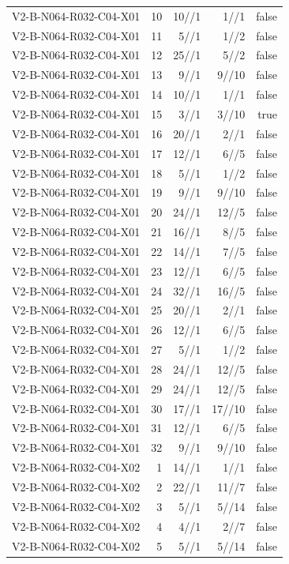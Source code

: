 {\begin{longtable}{lrrrr}
V2-B-N064-R032-C04-X01 & 10 & 10//1 & 1//1 & false \\
V2-B-N064-R032-C04-X01 & 11 & 5//1 & 1//2 & false \\
V2-B-N064-R032-C04-X01 & 12 & 25//1 & 5//2 & false \\
V2-B-N064-R032-C04-X01 & 13 & 9//1 & 9//10 & false \\
V2-B-N064-R032-C04-X01 & 14 & 10//1 & 1//1 & false \\
V2-B-N064-R032-C04-X01 & 15 & 3//1 & 3//10 & true \\
V2-B-N064-R032-C04-X01 & 16 & 20//1 & 2//1 & false \\
V2-B-N064-R032-C04-X01 & 17 & 12//1 & 6//5 & false \\
V2-B-N064-R032-C04-X01 & 18 & 5//1 & 1//2 & false \\
V2-B-N064-R032-C04-X01 & 19 & 9//1 & 9//10 & false \\
V2-B-N064-R032-C04-X01 & 20 & 24//1 & 12//5 & false \\
V2-B-N064-R032-C04-X01 & 21 & 16//1 & 8//5 & false \\
V2-B-N064-R032-C04-X01 & 22 & 14//1 & 7//5 & false \\
V2-B-N064-R032-C04-X01 & 23 & 12//1 & 6//5 & false \\
V2-B-N064-R032-C04-X01 & 24 & 32//1 & 16//5 & false \\
V2-B-N064-R032-C04-X01 & 25 & 20//1 & 2//1 & false \\
V2-B-N064-R032-C04-X01 & 26 & 12//1 & 6//5 & false \\
V2-B-N064-R032-C04-X01 & 27 & 5//1 & 1//2 & false \\
V2-B-N064-R032-C04-X01 & 28 & 24//1 & 12//5 & false \\
V2-B-N064-R032-C04-X01 & 29 & 24//1 & 12//5 & false \\
V2-B-N064-R032-C04-X01 & 30 & 17//1 & 17//10 & false \\
V2-B-N064-R032-C04-X01 & 31 & 12//1 & 6//5 & false \\
V2-B-N064-R032-C04-X01 & 32 & 9//1 & 9//10 & false \\
V2-B-N064-R032-C04-X02 & 1 & 14//1 & 1//1 & false \\
V2-B-N064-R032-C04-X02 & 2 & 22//1 & 11//7 & false \\
V2-B-N064-R032-C04-X02 & 3 & 5//1 & 5//14 & false \\
V2-B-N064-R032-C04-X02 & 4 & 4//1 & 2//7 & false \\
V2-B-N064-R032-C04-X02 & 5 & 5//1 & 5//14 & false \\

\end{longtable}}
